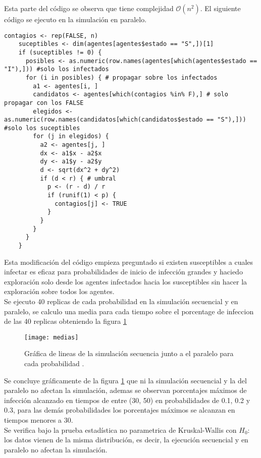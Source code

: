 \documentclass[10pt,a4paper]{article}
\begin{document}
Esta parte del código se observa que tiene complejidad $\mathcal{O}(n^{2})$. El siguiente código se ejecuto en la simulación en paralelo.

\begin{lstlisting}
contagios <- rep(FALSE, n)
    suceptibles <- dim(agentes[agentes$estado == "S",])[1]
    if (suceptibles != 0) {
      posibles <- as.numeric(row.names(agentes[which(agentes$estado == "I"),])) #solo los infectados
      for (i in posibles) { # propagar sobre los infectados
        a1 <- agentes[i, ]
        candidatos <- agentes[which(contagios %in% F),] # solo propagar con los FALSE
        elegidos <- as.numeric(row.names(candidatos[which(candidatos$estado == "S"),])) #solo los suceptibles
        for (j in elegidos) {
          a2 <- agentes[j, ]
          dx <- a1$x - a2$x
          dy <- a1$y - a2$y
          d <- sqrt(dx^2 + dy^2)
          if (d < r) { # umbral
            p <- (r - d) / r
            if (runif(1) < p) {
              contagios[j] <- TRUE
            }
          }
        } 
      }
    }
\end{lstlisting}

Esta modificación del código empieza preguntado si existen susceptibles a cuales infectar es eficaz para probabilidades de inicio de infección grandes y haciedo exploración solo desde los agentes infectados hacia los susceptibles sin hacer la exploración sobre todos los agentes. \\

Se ejecuto 40 replicas de cada probabilidad en la simulación secuencial y en paralelo, se calculo una media para cada tiempo sobre el porcentage de infeccion de las 40 replicas obteniendo la figura \ref{fig:ejemplo}

\begin{figure}[H]
   \centering
    \texttt{[image: medias]}
  \caption{Gráfica de lineas de la simulación secuencia junto a el paralelo para cada probabilidad .}
  \label{fig:ejemplo}
\end{figure}

Se concluye gráficamente de la figura \ref{fig:ejemplo} que ni la simulación secuencial y la del paralelo no afectan la simulación, ademas se observan porcentajes máximos de infección alcanzado en tiempos de entre (30, 50) en probabilidades de 0.1, 0.2 y 0.3, para las demás probabilidades los porcentajes máximos se alcanzan en tiempos menores a 30.\\

Se verifica bajo la prueba estadística no parametrica de Kruskal-Wallis con $H_{0}$: los datos vienen de la misma distribución, es decir, la ejecución secuencial y en paralelo no afectan la simulación.
\end{document}
